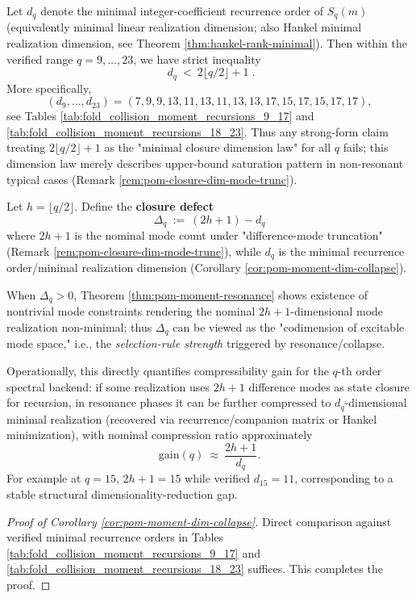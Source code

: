 \begin{corollary}[Failure of closure-dimension extrapolation at \texorpdfstring{$q\ge 9$}{q>=9} (counterexample family)]\label{cor:pom-moment-dim-collapse}
Let \(d_q\) denote the minimal integer-coefficient recurrence order of \(S_q(m)\) (equivalently minimal linear realization dimension; also Hankel minimal realization dimension, see Theorem \ref{thm:hankel-rank-minimal}).
Then within the verified range \(q=9,\dots,23\), we have strict inequality
\[
\boxed{\;
d_q\ <\ 2\lfloor q/2\rfloor+1\; }.
\]
More specifically,
\[
(d_9,\dots,d_{23})=(7,9,9,13,11,13,11,13,13,17,15,17,15,17,17),
\]
see Tables \ref{tab:fold_collision_moment_recursions_9_17} and \ref{tab:fold_collision_moment_recursions_18_23}.
Thus any strong-form claim treating \(2\lfloor q/2\rfloor+1\) as the "minimal closure dimension law" for all \(q\) fails; this dimension law merely describes upper-bound saturation pattern in non-resonant typical cases (Remark \ref{rem:pom-closure-dim-mode-trunc}).
\end{corollary}
\begin{definition}\label{def:pom-closure-defect-deltaq}
Let \(h=\lfloor q/2\rfloor\).
Define the \textbf{closure defect}
\[
\boxed{\;
\Delta_q\ :=\ (2h+1)-d_q\;}
\]
where \(2h+1\) is the nominal mode count under "difference-mode truncation" (Remark \ref{rem:pom-closure-dim-mode-trunc}), while \(d_q\) is the minimal recurrence order/minimal realization dimension (Corollary \ref{cor:pom-moment-dim-collapse}).
\end{definition}
\begin{remark}\label{rem:pom-closure-defect-selection-rule}
When \(\Delta_q>0\), Theorem \ref{thm:pom-moment-resonance} shows existence of nontrivial mode constraints rendering the nominal \(2h+1\)-dimensional mode realization non-minimal; thus \(\Delta_q\) can be viewed as the "codimension of excitable mode space," i.e., the \emph{selection-rule strength} triggered by resonance/collapse.
\par
Operationally, this directly quantifies compressibility gain for the \(q\)-th order spectral backend: if some realization uses \(2h+1\) difference modes as state closure for recursion, in resonance phases it can be further compressed to \(d_q\)-dimensional minimal realization (recovered via recurrence/companion matrix or Hankel minimization), with nominal compression ratio approximately
\[
\mathrm{gain}(q)\ \approx\ \frac{2h+1}{d_q}.
\]
For example at \(q=15\), \(2h+1=15\) while verified \(d_{15}=11\), corresponding to a stable structural dimensionality-reduction gap.
\end{remark}
\begin{proof}[Proof of Corollary \ref{cor:pom-moment-dim-collapse}]
Direct comparison against verified minimal recurrence orders in Tables \ref{tab:fold_collision_moment_recursions_9_17} and \ref{tab:fold_collision_moment_recursions_18_23} suffices. This completes the proof.
\end{proof}

